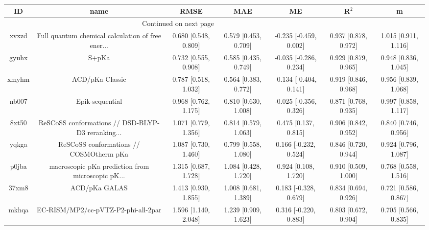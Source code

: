 \documentclass{article}
\begin{document}
\begin{center}
\begin{longtable}{|ccccccc|}
\toprule
    ID &                                               name &                  RMSE &                   MAE &                       ME &                 R$^2$ &                      m \\
\midrule
\endhead
\midrule
\multicolumn{3}{r}{{Continued on next page}} \\
\midrule
\endfoot

\bottomrule
\endlastfoot
 xvxzd &  Full quantum chemical calculation of free ener... &  0.680 [0.548, 0.809] &  0.579 [0.453, 0.709] &   -0.235 [-0.459, 0.002] &  0.937 [0.878, 0.972] &   1.015 [0.911, 1.116] \\
 gyuhx &                                              S+pKa &  0.732 [0.555, 0.908] &  0.585 [0.435, 0.749] &   -0.035 [-0.286, 0.234] &  0.929 [0.879, 0.965] &   0.948 [0.836, 1.045] \\
 xmyhm &                                    ACD/pKa Classic &  0.787 [0.518, 1.032] &  0.564 [0.383, 0.772] &   -0.134 [-0.404, 0.141] &  0.919 [0.846, 0.968] &   0.956 [0.839, 1.068] \\
 nb007 &                                    Epik-sequential &  0.968 [0.762, 1.175] &  0.810 [0.630, 1.008] &   -0.025 [-0.356, 0.326] &  0.871 [0.768, 0.935] &   0.997 [0.858, 1.117] \\
 8xt50 &  ReSCoSS conformations // DSD-BLYP-D3 reranking... &  1.071 [0.779, 1.356] &  0.814 [0.579, 1.063] &     0.475 [0.137, 0.815] &  0.906 [0.842, 0.952] &   0.840 [0.746, 0.956] \\
 yqkga &            ReSCoSS conformations // COSMOtherm pKa &  1.087 [0.730, 1.460] &  0.799 [0.558, 1.080] &    0.166 [-0.232, 0.524] &  0.846 [0.720, 0.944] &   0.924 [0.796, 1.087] \\
 p0jba &  macroscopic pKa prediction from microscopic pK... &  1.315 [0.687, 1.728] &  1.084 [0.428, 1.720] &     0.924 [0.108, 1.720] &  0.910 [0.509, 1.000] &   0.768 [0.558, 1.516] \\
 37xm8 &                                      ACD/pKa GALAS &  1.413 [0.930, 1.855] &  1.008 [0.681, 1.389] &    0.183 [-0.328, 0.679] &  0.834 [0.694, 0.926] &   0.721 [0.586, 0.867] \\
 mkhqa &                EC-RISM/MP2/cc-pVTZ-P2-phi-all-2par &  1.596 [1.140, 2.048] &  1.239 [0.909, 1.623] &    0.316 [-0.220, 0.883] &  0.803 [0.672, 0.904] &   0.705 [0.566, 0.835] \\

\end{longtable}
\end{center}
\end{document}

